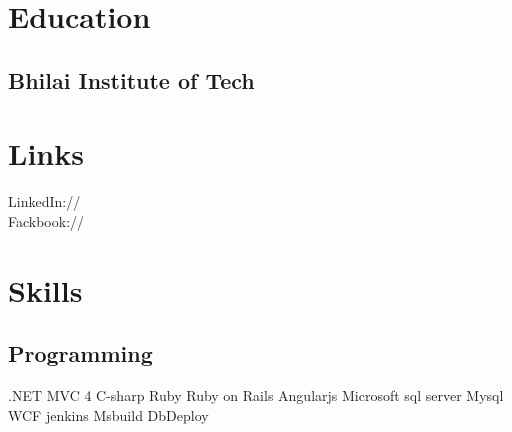 \documentclass[]{deedy-resume-openfont}
\begin{document}
%
%
\lastupdated

%
%



%
%

\begin{minipage}[t]{0.33\textwidth} 


\section{Education} 

\subsection{Bhilai Institute of Tech}
\sectionsep


\section{Links} 
LinkedIn://  \href{https://www.linkedin.com/pub/yashjeet-luthra/72/280/3a4}{} \\
Fackbook://  \href{https://www.facebook.com/yashjeetl}{} \\



\section{Skills}
\subsection{Programming}
.NET MVC 4 \textbullet{} C-sharp \textbullet{} Ruby \textbullet{} Ruby on Rails \textbullet{} Angularjs \textbullet{} Microsoft sql server  \textbullet{} Mysql  \textbullet{}
WCF \textbullet{} jenkins \textbullet{} Msbuild \textbullet{} DbDeploy \textbullet{}  
\sectionsep



\end{minipage}
\end{document}
